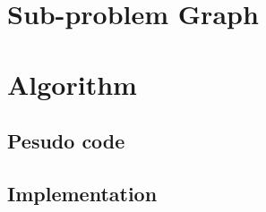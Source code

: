 \documentclass{beamer}
\begin{document}
\section{Sub-problem Graph}
\begin{frame}
	
\end{frame}

\section{Algorithm}
\begin{frame}
	
\end{frame}
\subsection{Pesudo code}
\begin{frame}
	
\end{frame}

\subsection{Implementation}
\begin{frame}
	
\end{frame}
\end{document}
